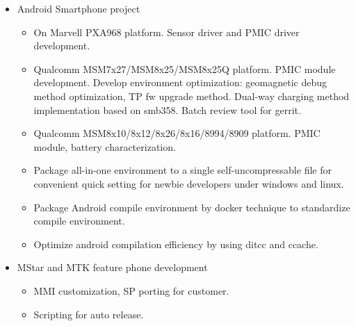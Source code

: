 \documentclass[10pt,a4paper,mono,final]{moderncv}   %
\begin{document}
\begin{CJK*}{UTF8}{gbsn}
{\begin{itemize}
  \item Android Smartphone project
    \begin{itemize}
    \item On Marvell PXA968 platform. Sensor driver and PMIC driver development.
    \item Qualcomm MSM7x27/MSM8x25/MSM8x25Q platform. PMIC module development. Develop environment optimization: geomagnetic debug method optimization, TP fw upgrade method. Dual-way charging method implementation based on smb358. Batch review tool for gerrit.
    \item Qualcomm MSM8x10/8x12/8x26/8x16/8994/8909 platform. PMIC module, battery characterization.
    \item Package all-in-one environment to a single self-uncompressable file for convenient quick setting for newbie developers under windows and linux.
    \item Package Android compile environment by docker technique to standardize compile environment.
    \item Optimize android compilation efficiency by using ditcc and ccache.
    \end{itemize}
  \item MStar and MTK feature phone development
    \begin{itemize}
    \item MMI customization, SP porting for customer.
    \item Scripting for auto release.
    \end{itemize}
  \end{itemize}
}
\end{CJK*}
\end{document}
